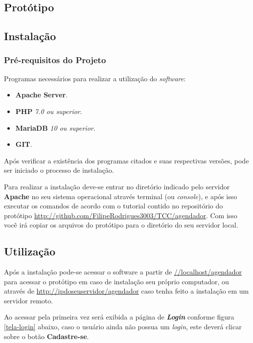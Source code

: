  
\begin{anexosenv}
\partanexos
\chapter{Prot\'otipo}
\pagestyle{simple}
\label{cap:manual}

\section{Instalação}

\subsection{Pré-requisitos do Projeto}

Programas necessários para realizar a utilização do \textit{software}:

\begin{itemize}
    \item \textbf{Apache Server}.
    \item \textbf{PHP} \textit{7.0 ou superior}.
    \item \textbf{MariaDB} \textit{10 ou superior}.
    \item \textbf{GIT}.
\end{itemize}

Após verificar a existência dos programas citados e suas respectivas versões, pode ser iniciado o processo de instalação.

Para realizar a instalação deve-se entrar no diretório indicado pelo servidor \textbf{Apache} no seu sistema operacional através terminal (ou \textit{console}), e após isso executar os comandos de acordo com o tutorial contido no repositório do protótipo  \url{http://github.com/FilipeRodrigues3003/TCC/agendador}. Com isso você irá copiar os arquivos do protótipo para o diretório do seu servidor local.


\section{Utilização}

Após a instalação pode-se acessar o software a partir de \url{//localhost/agendador} para acessar o protótipo em caso de instalação seu próprio computador, ou através de \url{http://ipdoseuservidor/agendador} caso tenha feito a instalação em um servidor remoto.

Ao acessar pela primeira vez será exibida a página de \textit{\textbf{Login}} conforme figura \ref{tela-login} abaixo, caso o usuário ainda não possua um \textit{login}, este deverá clicar sobre o botão \textbf{Cadastre-se}.


\end{anexosenv}
